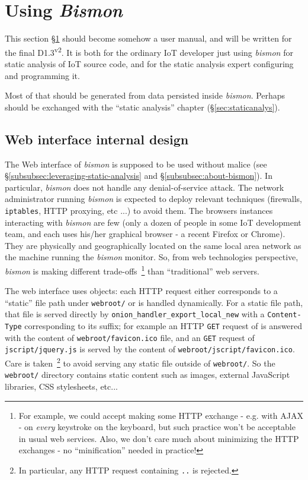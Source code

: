 \section{Using \emph{Bismon}}
\label{sec:using}

This section §\ref{sec:using} should become somehow a user manual, and
will be written for the final D1.3\textsuperscript{v2}. It is both for
the ordinary IoT developer just using \emph{bismon} for static
analysis of IoT source code, and for the static analysis expert
configuring and programming it.

Most of that should be generated from data persisted inside \emph{bismon}. Perhaps
should be exchanged with the ``static analysis'' chapter
(§\ref{sec:staticanalys}).


\subsection{Web interface internal design}
\label{subsec:webinterf}

The Web interface of \emph{bismon} is supposed to be used without
malice (see §\ref{subsubsec:leveraging-static-analysis} and
§\ref{subsubsec:about-bismon}). In particular, \emph{bismon} does not
handle any denial-of-service attack. The network administrator running
\emph{bismon} is expected to deploy relevant techniques (firewalls,
\texttt{iptables}, HTTP proxying, etc ...) to avoid them. The browsers
instances interacting with \emph{bismon} are few (only a dozen of
people in some IoT development team, and each uses his/her graphical
browser - a recent Firefox or Chrome). They are physically and
geographically located on the same local area network as the machine
running the \emph{bismon} monitor. So, from web technologies
perspective, \emph{bismon} is making different
trade-offs~\footnote{For example, we could accept making some HTTP
  exchange - e.g. with AJAX - on \emph{every} keystroke on the
  keyboard, but such practice won't be acceptable in usual web
  services. Also, we don't care much about minimizing the HTTP
  exchanges - no ``minification'' needed in practice!} than
``traditional'' web servers.

The web interface uses objects: each HTTP request either corresponds
to a ``static'' file path under \texttt{webroot/} or is handled
dynamically. For a static file path, that file is served directly by
\texttt{onion\_handler\_export\_local\_new} with a
\texttt{Content-Type} corresponding to its suffix; for example an HTTP
\texttt{GET} request of  is answered with the
content of \texttt{webroot/favicon.ico} file, and an \texttt{GET}
request of \texttt{jscript/jquery.js} is served by the content of
\texttt{webroot/jscript/favicon.ico}. Care is taken~\footnote{In
  particular, any HTTP request containing \texttt{..} is rejected.} to
avoid serving any static file outside of \texttt{webroot/}. So the
\texttt{webroot/} directory contains static content such as images,
external JavaScript libraries, CSS stylesheets, etc...


